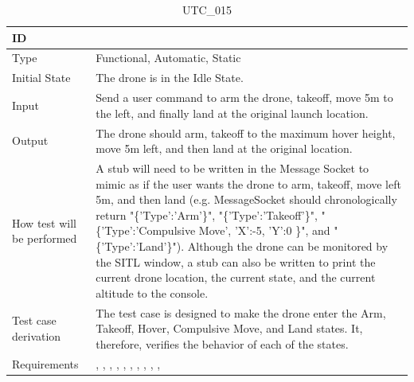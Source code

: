 \documentclass[12pt, titlepage]{article}
\begin{document}
\begin{table}[!h]
\begin{center}
\caption {UTC\_015}
\label{tab:UTC_015}
\begin{tabular}{ | m{3.2cm} | m{12.2cm} | } 
\hline
ID & \nameref{tab:UTC_015} \\ 
\hline
Type &  Functional, Automatic, Static  \\ 
\hline
Initial State & The drone is in the Idle State. \\ 
\hline
Input &  Send a user command to arm the drone, takeoff, move 5m to the left, and finally land at the original launch location. \\ 
\hline
Output &  The drone should arm, takeoff to the maximum hover height, move 5m left, and then land at the original location. \\ 
\hline
How test will be performed & A stub will need to be written in the Message Socket to mimic as if the user wants the drone to arm, takeoff, move left 5m, and then land (e.g. MessageSocket should chronologically return "\{'Type':'Arm'\}", "\{'Type':'Takeoff'\}", "\{'Type':'Compulsive Move', 'X':-5, 'Y':0 \}", and "\{'Type':'Land'\}"). Although the drone can be monitored by the SITL window, a stub can also be written to print the current drone location, the current state, and the current altitude to the console.\\ 
\hline
Test case derivation &  The test case is designed to make the drone enter the Arm, Takeoff, Hover, Compulsive Move, and Land states. It, therefore, verifies the behavior of each of the states.\\ 
\hline
Requirements & \nameref{STA_000}, \nameref{STA_001}, \nameref{STA_004}, \nameref{STA_011}, \nameref{STA_012}, \nameref{STA_013}, \nameref{TRANS_003}, \nameref{TRANS_009}, \nameref{TRANS_012}, \nameref{TRANS_013}, \nameref{TRANS_014} \\ 
\hline
\end{tabular}
\end{center}
\end{table}
\end{document}
